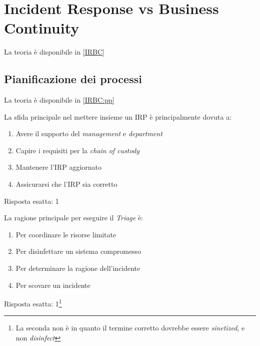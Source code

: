 \section{Incident Response vs Business Continuity}
\label{esIRBC}

La teoria \`e disponibile in \ref{IRBC}

\subsection{Pianificazione dei processi}
\label{esIRBC:pp}

La teoria \`e disponibile in \ref{IRBC:pp}



\begin{Exercise} [
  title={Quiz},
  label={esIRBC1}
  ]

  \Question La sfida principale nel mettere insieme un IRP \`e principalmente
dovuta a:
\begin{enumerate}
 \item Avere il supporto del \textit{management} e \textit{department}
 \item Capire i requisiti per la \textit{chain of custody}
 \item Mantenere l'IRP aggiornato
 \item Assicurarsi che l'IRP sia corretto
\end{enumerate}
\end{Exercise}

\begin{Answer} [
  ref={esIRBC1},
  number={1}
  ]

  \Question Risposta esatta: 1
\end{Answer}


\begin{Exercise} [
  title={Quiz},
  label={esIRBC2}
  ]

  \Question La ragione principale per eseguire il \textit{Triage} \`e:
  \begin{enumerate}
   \item Per coordinare le risorse limitate
   \item Per disinfettare un sistema compromesso
   \item Per determinare la ragione dell'incidente
   \item Per scovare un incidente
  \end{enumerate}

\end{Exercise}

\begin{Answer} [
  ref={esIRBC2},
  number={2}
  ]

  \Question Risposta esatta: 1\footnote{La seconda non \`e in quanto il termine
corretto dovrebbe essere \textit{sinetized}, e non \textit{disinfect}}
\end{Answer}


